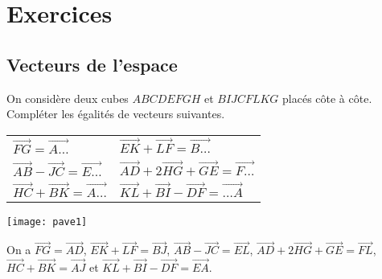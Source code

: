 \documentclass[11pt,fleqn, openany]{book} %
\begin{document}

\chapter{Exercices}


\section*{Vecteurs de l'espace}


\begin{exercise}\hspace{0pt}

\begin{minipage}{0.5 \linewidth}On considère deux cubes $ABCDEFGH$ et $BIJCFLKG$ placés côte à côte. Compléter les égalités de vecteurs suivantes.
\vskip10pt
\begin{tabularx}{\linewidth}{XX}
 $\overrightarrow{FG} = \overrightarrow{A\ldots}$ & $\overrightarrow{EK}+\overrightarrow{LF}= \overrightarrow{B\ldots}$ \\
 $\overrightarrow{AB}- \overrightarrow{JC} = \overrightarrow{E\ldots}$ &  $\overrightarrow{AD}+2\overrightarrow{HG}+\overrightarrow{GE}=\overrightarrow{F\ldots}$ \\
 $\overrightarrow{HC}+\overrightarrow{BK} = \overrightarrow{A\ldots}$ & $\overrightarrow{KL} + \overrightarrow{BI} - \overrightarrow{DF} = \overrightarrow{\ldots A}$
\end{tabularx}


\end{minipage}\hfill \begin{minipage}{0.4\linewidth}
\texttt{[image: pave1]}

\end{minipage}
\vspace{-0.5cm}\end{exercise}

\begin{solution}On a  $\overrightarrow{FG} = \overrightarrow{AD}$, $\overrightarrow{EK}+\overrightarrow{LF}= \overrightarrow{BJ}$, $\overrightarrow{AB}- \overrightarrow{JC} = \overrightarrow{EL}$,  $\overrightarrow{AD}+2\overrightarrow{HG}+\overrightarrow{GE}=\overrightarrow{FL}$, $\overrightarrow{HC}+\overrightarrow{BK} = \overrightarrow{AJ}$ et $\overrightarrow{KL} + \overrightarrow{BI} - \overrightarrow{DF} = \overrightarrow{EA}$.\end{solution}
\end{document}
